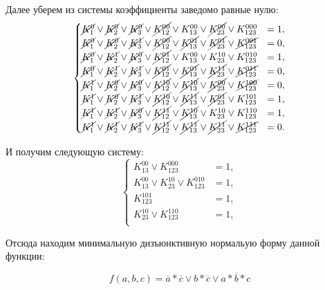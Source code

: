 Далее уберем из системы коэффициенты заведомо равные нулю:\\
\[
\begin{cases}
\cancel{K_1^0} \lor \cancel{K_2^0} \lor \cancel{K_3^0} \lor \cancel{K_{12}^{00}} \lor K_{13}^{00} \lor \cancel{K_{23}^{00}} \lor K_{123}^{000}&=1,\\
\cancel{K_1^0} \lor \cancel{K_2^0} \lor \cancel{K_3^1} \lor \cancel{K_{12}^{00}} \lor \cancel{K_{13}^{01}} \lor \cancel{K_{23}^{01}} \lor \cancel{K_{123}^{001}}&=0,\\
\cancel{K_1^0} \lor \cancel{K_2^1} \lor \cancel{K_3^0} \lor \cancel{K_{12}^{01}} \lor K_{13}^{00} \lor K_{23}^{10} \lor K_{123}^{010}&=1,\\
\cancel{K_1^0} \lor \cancel{K_2^1} \lor \cancel{K_3^1} \lor \cancel{K_{12}^{01}} \lor \cancel{K_{13}^{01}} \lor \cancel{K_{23}^{11}} \lor \cancel{K_{123}^{011}}&=0,\\
\cancel{K_1^1} \lor \cancel{K_2^0} \lor \cancel{K_3^0} \lor \cancel{K_{12}^{10}} \lor \cancel{K_{13}^{10}} \lor \cancel{K_{23}^{00}} \lor \cancel{K_{123}^{100}}&=0,\\
\cancel{K_1^1} \lor \cancel{K_2^0} \lor \cancel{K_3^1} \lor \cancel{K_{12}^{10}} \lor \cancel{K_{13}^{11}} \lor \cancel{K_{23}^{01}} \lor K_{123}^{101}&=1,\\
\cancel{K_1^1} \lor \cancel{K_2^1} \lor \cancel{K_3^0} \lor \cancel{K_{12}^{11}} \lor \cancel{K_{13}^{10}} \lor K_{23}^{10} \lor K_{123}^{110}&=1,\\
\cancel{K_1^1} \lor \cancel{K_2^1} \lor \cancel{K_3^1} \lor \cancel{K_{12}^{11}} \lor \cancel{K_{13}^{11}} \lor \cancel{K_{23}^{11}} \lor \cancel{K_{123}^{111}}&=0.
\end{cases}
\]

И получим следующую систему:\\
\[
\begin{cases}
 K_{13}^{00} \lor K_{123}^{000}&=1,\\
 K_{13}^{00} \lor K_{23}^{10} \lor K_{123}^{010}&=1,\\
 K_{123}^{101}&=1,\\
 K_{23}^{10} \lor K_{123}^{110}&=1,\\
\end{cases}
\] 

Отсюда находим минимальную дизъюнктивную нормальую форму данной функции:

\begin{equation*}
f(a,b,c)={\overline{a}*\overline{c}} \lor {b*\overline{c}} \lor {a*\overline{b}*c}
\end{equation*}

